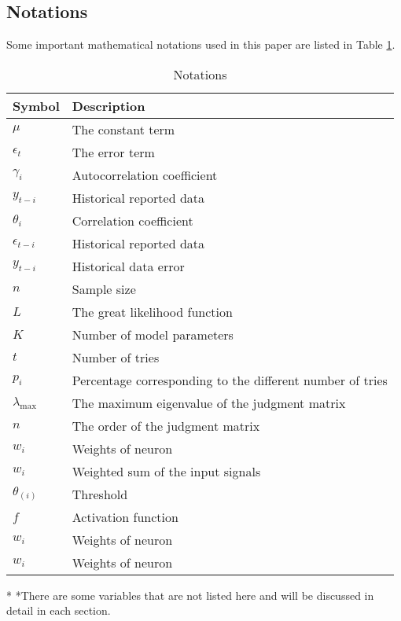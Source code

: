\documentclass[12pt]{article}  %
\begin{document}
\subsection{Notations}
Some important mathematical notations used in this paper are listed in Table \ref{tab}. 

\begin{table}[htbp]
	\begin{center}
		\caption{Notations}
		\begin{tabular}{m{1.5cm} m{12cm}}%
			\toprule[2pt]
			\multicolumn{1}{m{2.7cm}}{\centering Symbol}%
			&\multicolumn{1}{m{12cm}}{\centering Description }\\%
			\midrule
			$\mu$& The constant term \\
			\vspace{2pt}
			$\epsilon_t$& The error term \\
			\vspace{2pt}
			$\gamma_i$& Autocorrelation coefficient \\
			\vspace{2pt}
			$y_{t-i}$& Historical reported data\\
			\vspace{2pt}
			$\theta_i$& Correlation coefficient \\
			$\epsilon_{t-i}$ & Historical reported data \\
			$y_{t-i}$ & Historical data error \\
			$n$ & Sample size \\
			$L$ & The great likelihood function \\
			$K$ & Number of model parameters \\
			$t$ & Number of tries \\
			$p_i$ & Percentage corresponding to the different number of tries \\
			$\lambda_{\text{max}}$ & The maximum eigenvalue of the judgment matrix \\
			$n$ & The order of the judgment matrix \\
			$w_i$ & Weights of neuron \\
			$w_i$ & Weighted sum of the input signals \\
			$\theta_{(i)}$ & Threshold \\
			$f$ & Activation function \\
			$w_i$ & Weights of neuron \\
			$w_i$ & Weights of neuron \\
			
			\bottomrule[2pt]
		\end{tabular}
		\label{tab}
		
		\begin{tablenotes}%
			\footnotesize
			\item[*] *There are some variables that are not listed here and will be discussed in detail in each section. %
		\end{tablenotes}
	\end{center}
\end{table}
\vspace{-0.5cm}
\end{document}
